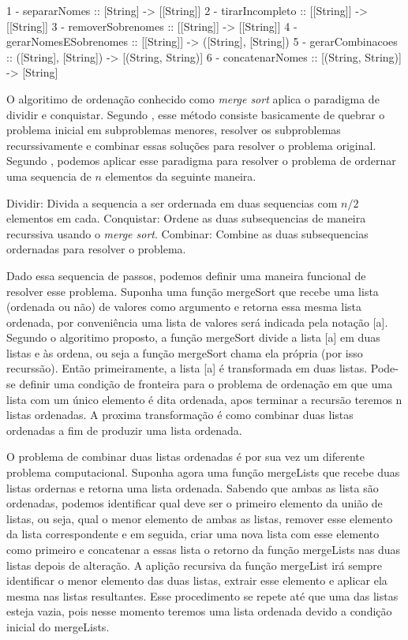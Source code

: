 1 - separarNomes :: [String] -> [[String]]
2 - tirarIncompleto :: [[String]] -> [[String]]
3 - removerSobrenomes :: [[String]] -> [[String]]
4 - gerarNomesESobrenomes :: [[String]] -> ([String], [String])
5 - gerarCombinacoes :: ([String], [String]) -> [(String, String)]
6 - concatenarNomes :: [(String, String)] -> [String]


O algoritimo de ordenação conhecido como \emph{merge sort} aplica o paradigma de dividir e conquistar.
Segundo \cite{Cormen}, esse método consiste basicamente de quebrar o problema inicial em subproblemas menores, resolver os subproblemas recurssivamente e combinar essas soluções para resolver o problema original.
Segundo \cite{Cormen}, podemos aplicar esse paradigma para resolver o problema de ordernar uma sequencia de $n$ elementos da seguinte maneira.
\begin{cite}
Dividir: Divida a sequencia a ser ordernada em duas sequencias com $n/2$ elementos em cada.
Conquistar: Ordene as duas subsequencias de maneira recurssiva usando o \emph{merge sort}.
Combinar: Combine as duas subsequencias ordernadas para resolver o problema.
\end{cite}

Dado essa sequencia de passos, podemos definir uma maneira funcional de resolver esse problema.
Suponha uma função mergeSort que recebe uma lista (ordenada ou não) de valores como argumento e retorna essa mesma lista ordenada, por conveniência uma lista de valores será indicada pela notação [a].
Segundo o algoritimo proposto, a função mergeSort divide a lista [a] em duas listas e às ordena, ou seja a função mergeSort chama ela própria (por isso recurssão).
Então primeiramente, a lista [a] é transformada em duas listas.
Pode-se definir uma condição de fronteira para o problema de ordenação em que uma lista com um único elemento é dita ordenada, apos terminar a recursão teremos n listas ordenadas.
A proxima transformação é como combinar duas listas ordenadas a fim de produzir uma lista ordenada.

O problema de combinar duas listas ordenadas é por sua vez um diferente problema computacional.
Suponha agora uma função mergeLists que recebe duas listas ordernas e retorna uma lista ordenada.
Sabendo que ambas as lista são ordenadas, podemos identificar qual deve ser o primeiro elemento da união de listas, ou seja, qual o menor elemento de ambas as listas, remover esse elemento da lista correspondente e em seguida, criar uma nova lista com esse elemento como primeiro e concatenar a essas lista o retorno da função mergeLists nas duas listas depois de alteração.
A aplição recursiva da função mergeList irá sempre identificar o menor elemento das duas listas, extrair esse elemento e aplicar ela mesma nas listas resultantes.
Esse procedimento se repete até que uma das listas esteja vazia, pois nesse momento teremos uma lista ordenada devido a condição inicial do mergeLists.


